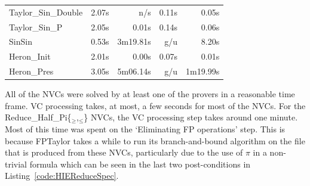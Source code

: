 \documentclass[runningheads]{llncs}
\begin{document}
\begin{table}[tb]
\begin{tabular}{l@{\kern1em}r@{\kern1em}r@{\kern1em}r@{\kern1em}r}
  Taylor\_Sin\_Double              & 2.07s   & n/s       & 0.11s       & 0.05s \\
  Taylor\_Sin\_P                   & 2.05s   & 0.01s     & 0.14s       & 0.06s \\
  SinSin                           & 0.53s   & 3m19.81s  & g/u         & 8.20s \\
  Heron\_Init                      & 2.01s   & 0.00s     & 0.07s       & 0.01s \\
  Heron\_Pres                      & 3.05s   & 5m06.14s  & g/u         & 1m19.99s \\
  \bottomrule
  \end{tabular}
\end{table}


All of the NVCs were solved by at least one of the provers in a reasonable time frame.
VC processing takes, at most, a few seconds for most of the NVCs.
For the Reduce\_Half\_Pi\{${}_\ge$,${}_\le$\} NVCs, the VC processing step takes around one minute.
Most of this time was spent on the `Eliminating FP operations' step.
This is because FPTaylor takes a while to run its branch-and-bound algorithm on the file that is produced from these NVCs, particularly due to the use of $\pi$ in a non-trivial formula which can be seen in the last two post-conditions in Listing~\ref{code:HIEReduceSpec}.
\end{document}
